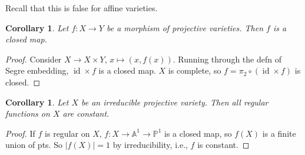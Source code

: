 \documentclass{article}
\theoremstyle{definition}
\theoremstyle{remark}
\theoremstyle{plain}
\newtheorem{crly}[defn]{Corollary}
\newcommand{\PP}{\mathbb{P}}
\newcommand{\bA}{\mathbb{A}}
\newcommand{\id}{\operatorname{id}}
\begin{document}
Recall that this is false for affine varieties.

\begin{crly}
    Let $f:X\to Y$ be a morphism of projective varieties. Then $f$ is a closed map.
\end{crly}
\begin{proof}
    Consider $X\to X\times Y$, $x\mapsto (x,f(x))$. Running through the defn of Segre embedding, $\id\times f$ is a closed map. $X$ is complete, so $f=\pi_2\circ (\id\times f)$ is closed.
\end{proof}
\begin{crly}
    Let $X$ be an irreducible projective variety. Then all regular functions on $X$ are constant.
\end{crly}
\begin{proof}
    If $f$ is regular on $X$, $f:X\to\bA^1\to\PP^1$ is a closed map, so $f(X)$ is a finite union of pts. So $|f(X)|=1$ by irreducibility, i.e., $f$ is constant.
\end{proof}
\end{document}
